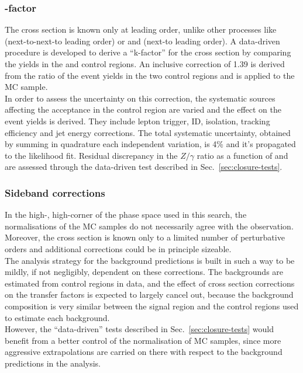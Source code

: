 \subsubsection{\texorpdfstring{\gj} k-factor}
\label{sec:gj-kfactor}
The \gj cross section is known only at leading order, unlike other processes like 
\ttj (next-to-next-to leading order) or \zj and \wj (next-to leading order). 
A data-driven procedure is developed to derive a ``k-factor'' for the \gj cross section 
by comparing the yields in the \gj and \mmj control regions. 
An inclusive correction of 1.39 is derived from the ratio of the event yields in the two 
control regions and is applied to the \gj MC sample. \\
In order to assess the uncertainty on this correction, the systematic sources affecting 
the acceptance in the \mmj control region are varied and the effect on the event yields is derived. 
They include lepton trigger, ID, isolation, tracking efficiency and jet energy corrections. 
The total systematic uncertainty, obtained by summing in quadrature each independent variation, 
is 4\% and it's propagated to the likelihood fit. 
Residual discrepancy in the $Z/\gamma$ ratio as a function of \scalht and \njet are assessed 
through the data-driven test described in Sec.~\ref{sec:closure-tests}.




\subsubsection{Sideband corrections}
\label{sec:sideband-corrections}

In the high-\scalht, high-\etmiss corner of the phase space used in this search, the normalisations of the MC samples do not necessarily agree with the observation. 
Moreover, the cross section is known only to a limited number of perturbative orders and additional corrections could be in principle sizeable. \\
The analysis strategy for the background predictions is built in such a way to be mildly, if not negligibly, dependent on these corrections. 
The backgrounds are estimated from control regions in data, and the effect of cross section corrections on the transfer factors is expected to largely cancel out, 
because the background composition is very similar between the signal region and the control regions used to estimate each background. \\
However, the ``data-driven'' tests described in Sec.~\ref{sec:closure-tests} would benefit from a better control of the normalisation of MC samples, 
since more aggressive extrapolations are carried on there with respect to the background predictions in the analysis. 

